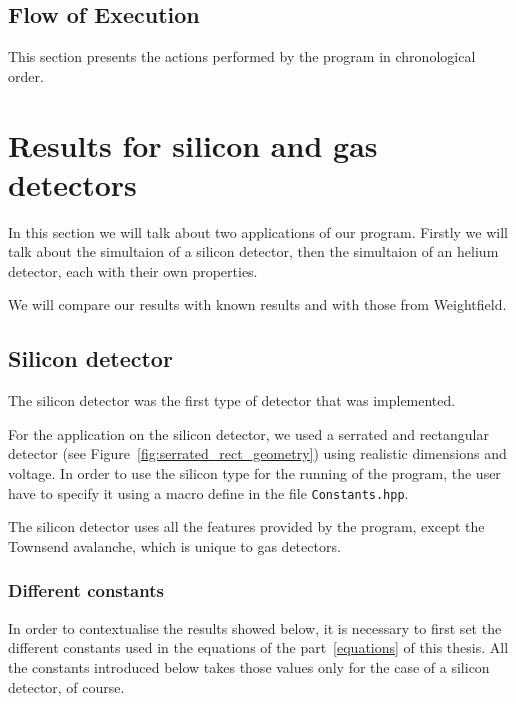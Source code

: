 \documentclass[11pt]{article}
\begin{document}
	\subsection{Flow of Execution}

		This section presents the actions performed by the program in chronological
		order.




\section{Results for silicon and gas detectors}

	In this section we will talk about two applications of our program.
	Firstly we will talk about the simultaion of a silicon detector, then the
	simultaion of an helium detector, each with their own properties.

	We will compare our results with known results and with those from Weightfield.

	\subsection{Silicon detector}

		The silicon detector was the first type of detector that was implemented.

		For the application on the silicon detector, we used a serrated and rectangular detector
		(see Figure~\ref{fig:serrated_rect_geometry}) using realistic dimensions and voltage.
		In order to use the silicon type for the running of the program, the user have to specify
		it using a macro define in the file \texttt{Constants.hpp}.

		The silicon detector uses all the features provided by the program, except the Townsend
		avalanche, which is unique to gas detectors.

		\subsubsection*{Different constants}

			In order to contextualise the results showed below, it is necessary to first set the
			different constants used in the equations of the part~\ref{equations} of this thesis.
			All the constants introduced below takes those values only for the case of a silicon
			detector, of course.
\end{document}
